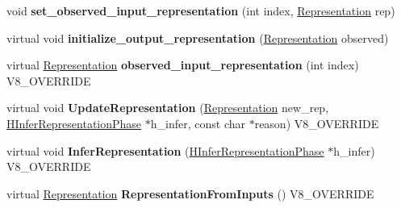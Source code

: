 \begin{DoxyCompactItemize}
\item 
\hypertarget{classv8_1_1internal_1_1_h_binary_operation_a62f72952aaa2a8def3eab5bac00912c1}{}void {\bfseries set\+\_\+observed\+\_\+input\+\_\+representation} (int index, \hyperlink{classv8_1_1internal_1_1_representation}{Representation} rep)\label{classv8_1_1internal_1_1_h_binary_operation_a62f72952aaa2a8def3eab5bac00912c1}

\item 
\hypertarget{classv8_1_1internal_1_1_h_binary_operation_a6584822dd034320b1abb7a295d5d76b1}{}virtual void {\bfseries initialize\+\_\+output\+\_\+representation} (\hyperlink{classv8_1_1internal_1_1_representation}{Representation} observed)\label{classv8_1_1internal_1_1_h_binary_operation_a6584822dd034320b1abb7a295d5d76b1}

\item 
\hypertarget{classv8_1_1internal_1_1_h_binary_operation_ae85a511947f002dd6ab8ba0e1b2c5079}{}virtual \hyperlink{classv8_1_1internal_1_1_representation}{Representation} {\bfseries observed\+\_\+input\+\_\+representation} (int index) V8\+\_\+\+O\+V\+E\+R\+R\+I\+D\+E\label{classv8_1_1internal_1_1_h_binary_operation_ae85a511947f002dd6ab8ba0e1b2c5079}

\item 
\hypertarget{classv8_1_1internal_1_1_h_binary_operation_a18240dce85e772c280bc363cce27a96e}{}virtual void {\bfseries Update\+Representation} (\hyperlink{classv8_1_1internal_1_1_representation}{Representation} new\+\_\+rep, \hyperlink{classv8_1_1internal_1_1_h_infer_representation_phase}{H\+Infer\+Representation\+Phase} $\ast$h\+\_\+infer, const char $\ast$reason) V8\+\_\+\+O\+V\+E\+R\+R\+I\+D\+E\label{classv8_1_1internal_1_1_h_binary_operation_a18240dce85e772c280bc363cce27a96e}

\item 
\hypertarget{classv8_1_1internal_1_1_h_binary_operation_a19b55dcb9265e4d196bac3eb1ec1af78}{}virtual void {\bfseries Infer\+Representation} (\hyperlink{classv8_1_1internal_1_1_h_infer_representation_phase}{H\+Infer\+Representation\+Phase} $\ast$h\+\_\+infer) V8\+\_\+\+O\+V\+E\+R\+R\+I\+D\+E\label{classv8_1_1internal_1_1_h_binary_operation_a19b55dcb9265e4d196bac3eb1ec1af78}

\item 
\hypertarget{classv8_1_1internal_1_1_h_binary_operation_a38c5dcca33c6dd166b8d0366b45d55a0}{}virtual \hyperlink{classv8_1_1internal_1_1_representation}{Representation} {\bfseries Representation\+From\+Inputs} () V8\+\_\+\+O\+V\+E\+R\+R\+I\+D\+E\label{classv8_1_1internal_1_1_h_binary_operation_a38c5dcca33c6dd166b8d0366b45d55a0}


\end{DoxyCompactItemize}
